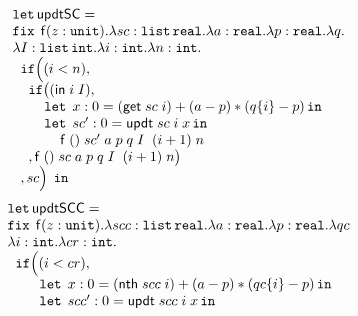 \begin{figure}
\small
\[
\begin{array}{l}
\mathop{\mathtt{let}} \mathsf{updtSC} =\\
                 \mathop{\mathtt{fix}} \;  \mathsf{f}(z: \mathtt{unit}). \lambda sc: \mathtt{list} \, \mathtt{real}. 
                 \lambda a: \mathtt{real}. \lambda p: \mathtt{real}. \lambda q.\\
                 \lambda I: \mathtt{list} \, \mathtt{int}. \lambda i: \mathtt{int}. \lambda n: \mathtt{int}. \\
 \hspace{.2cm}   \mathtt{if} \Big ( (i < n)  ,  \\
 \hspace{0.4cm}  \mathtt{if} \big( ( \mathsf{in} \; i \; I  ) ,       \\
 \hspace{0.8cm}  \mathop{\mathtt{let}} \; x: 0 =( \mathsf{get} \; sc \; i) 
                 + (a-p)*(q \{ i\} - p)  \mathop{ \mathtt{in}} \\
 \hspace{0.8cm}  \mathop{\mathtt{let}} \; sc': 0 =  \mathsf{updt} \; sc \; i
                 \; x \mathop{ \mathtt{in}} \\
 \hspace{1.2cm}  \mathsf{f}  \; () \; sc' \; a \; p
                 \; q \; I \;  \; (i+1) \; n  \\ 
 \hspace{0.4cm}  , \mathsf{f}  \; () \; sc \; a \; p
                 \; q \; I \;  \; (i+1) \; n \big )  \\ 
 \hspace{0.2cm}  , sc  \Big ) \; \mathop{ \mathtt{in}}
\end{array}
\]
%
%
\[
\begin{array}{l}
\mathop{\mathtt{let}} \mathsf{updtSCC} = \\
                \mathop{\mathtt{fix}} \;  \mathsf{f}(z: \mathtt{unit}). \lambda scc: \mathtt{list} \, \mathtt{real}. \lambda a: \mathtt{real}. 
                \lambda p: \mathtt{real}. \lambda qc\\ 
                \lambda i: \mathtt{int}. \lambda cr: \mathtt{int}. \\
 \hspace{.2cm}  \mathtt{if} \Big ( (i < cr) ,  \\
 \hspace{0.8cm} \mathop{\mathtt{let}} \; x: 0 =( \mathsf{nth} \; scc \; i) 
                + (a-p)*(qc \{ i\} - p)  \mathop{ \mathtt{in}} \\
 \hspace{0.8cm} \mathop{\mathtt{let}} \; scc': 0 =  \mathsf{updt} \; scc \; i
                \; x \mathop{ \mathtt{in}} \\

\end{array}\]
\end{figure}
